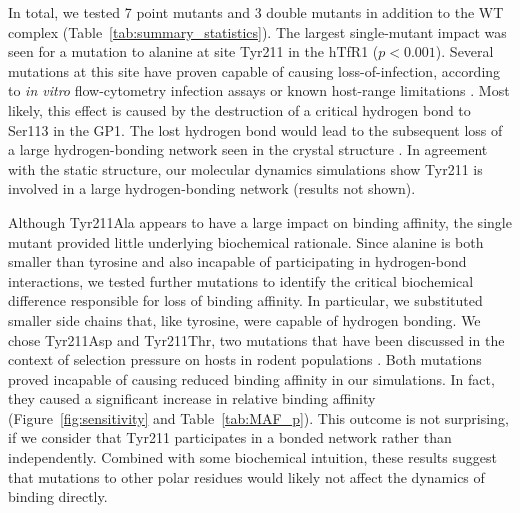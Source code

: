 \documentclass[12pt]{article}
\begin{document}
In total, we tested 7 point mutants and 3 double mutants in addition to the WT complex (Table~\ref{tab:summary_statistics}). The largest single-mutant impact was seen for a mutation to alanine at site Tyr211 in the hTfR1 ($ p < 0.001 $).  Several mutations at this site have proven capable of causing loss-of-infection, according to \textit{in vitro} flow-cytometry infection assays or known host-range limitations \citep{Rad2008,Rad20111,Rad20112}. Most likely, this effect is caused by the destruction of a critical hydrogen bond to Ser113 in the GP1. The lost hydrogen bond would lead to the subsequent loss of a large hydrogen-bonding network seen in the crystal structure \citep{Abraham2010}. In agreement with the static structure, our molecular dynamics simulations show Tyr211 is involved in a large hydrogen-bonding network (results not shown). 

Although Tyr211Ala appears to have a large impact on binding affinity, the single mutant provided little underlying biochemical rationale. Since alanine is both smaller than tyrosine and also incapable of participating in hydrogen-bond interactions, we tested further mutations to identify the critical biochemical difference responsible for loss of binding affinity. In particular, we substituted smaller side chains that, like tyrosine, were capable of hydrogen bonding. We chose Tyr211Asp and Tyr211Thr, two mutations that have been discussed in the context of selection pressure on hosts in rodent populations \citep{Rad2008,Rad20111,Rad20112}. Both mutations proved incapable of causing reduced binding affinity in our simulations. In fact, they caused a significant increase in relative binding affinity (Figure~\ref{fig:sensitivity} and Table~\ref{tab:MAF_p}). This outcome is not surprising, if we consider that Tyr211 participates in a bonded network rather than independently. Combined with some biochemical intuition, these results suggest that mutations to other polar residues would likely not affect the dynamics of binding directly.
\end{document}
